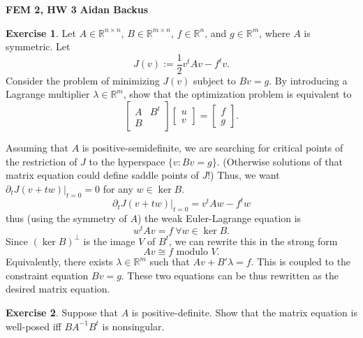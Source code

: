 \documentclass[10pt]{article}
\newcommand{\RR}{\mathbb{R}}
\theoremstyle{definition}
\newtheorem{exer}{Exercise}
\begin{document}
\noindent
\large\textbf{FEM 2, HW 3} \hfill \textbf{Aidan Backus} \\

\begin{exer}
    Let $A \in \RR^{n \times n}$, $B \in \RR^{m \times n}$, $f \in \RR^n$, and $g \in \RR^m$, where $A$ is symmetric.
    Let
    $$J(v) := \frac{1}{2} v^tAv - f^tv.$$
    Consider the problem of minimizing $J(v)$ subject to $Bv = g$.
    By introducing a Lagrange multiplier $\lambda \in \RR^m$, show that the optimization problem is equivalent to 
    $$\begin{bmatrix}A & B^t \\ B\end{bmatrix} \begin{bmatrix}u \\ v \end{bmatrix} = \begin{bmatrix}f \\ g\end{bmatrix}.$$
\end{exer}

Assuming that $A$ is positive-semidefinite, we are searching for critical points of the restriction of $J$ to the hyperspace $\{v: Bv = g\}$.
(Otherwise solutions of that matrix equation could define saddle points of $J$!)
Thus, we want $\partial_t J(v + tw)|_{t = 0} = 0$ for any $w \in \ker B$.
$$\partial_t J(v + tw)|_{t = 0} = v^t Aw - f^t w$$
thus (using the symmetry of $A$) the weak Euler-Lagrange equation is 
$$w^t Av = f ~\forall w \in \ker B.$$
Since $(\ker B)^\perp$ is the image $V$ of $B^t$, we can rewrite this in the strong form
$$Av \cong f \text{ modulo } V.$$
Equivalently, there exists $\lambda \in \RR^m$ such that $Av + B'\lambda = f$.
This is coupled to the constraint equation $Bv = g$.
These two equations can be thus rewritten as the desired matrix equation.

\begin{exer}
    Suppose that $A$ is positive-definite.
    Show that the matrix equation is well-posed iff $BA^{-1}B^t$ is nonsingular.
\end{exer}
\end{document}
